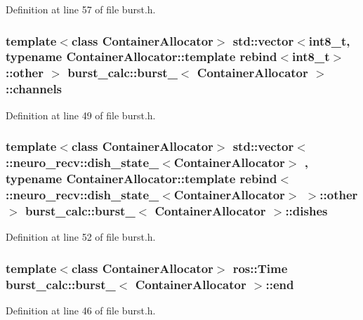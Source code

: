 \-Definition at line 57 of file burst.\-h.

\subsubsection[{channels}]{\setlength{\rightskip}{0pt plus 5cm}template$<$class \-Container\-Allocator$>$ std\-::vector$<$int8\-\_\-t, typename \-Container\-Allocator\-::template rebind$<$int8\-\_\-t$>$\-::other $>$ {\bf burst\-\_\-calc\-::burst\-\_\-}$<$ \-Container\-Allocator $>$\-::{\bf channels}}\label{structburst__calc_1_1burst___a02f9f748c2c2d64b4d9606f755377383}


\-Definition at line 49 of file burst.\-h.

\subsubsection[{dishes}]{\setlength{\rightskip}{0pt plus 5cm}template$<$class \-Container\-Allocator$>$ std\-::vector$<$ \-::neuro\-\_\-recv\-::dish\-\_\-state\-\_\-$<$\-Container\-Allocator$>$ , typename \-Container\-Allocator\-::template rebind$<$ \-::neuro\-\_\-recv\-::dish\-\_\-state\-\_\-$<$\-Container\-Allocator$>$ $>$\-::other $>$ {\bf burst\-\_\-calc\-::burst\-\_\-}$<$ \-Container\-Allocator $>$\-::{\bf dishes}}\label{structburst__calc_1_1burst___af7ff9bcbe0570f9ea068f155aa49039d}


\-Definition at line 52 of file burst.\-h.

\subsubsection[{end}]{\setlength{\rightskip}{0pt plus 5cm}template$<$class \-Container\-Allocator$>$ ros\-::\-Time {\bf burst\-\_\-calc\-::burst\-\_\-}$<$ \-Container\-Allocator $>$\-::{\bf end}}\label{structburst__calc_1_1burst___ab4f875299668f360185bec7e26e8ce11}


\-Definition at line 46 of file burst.\-h.

